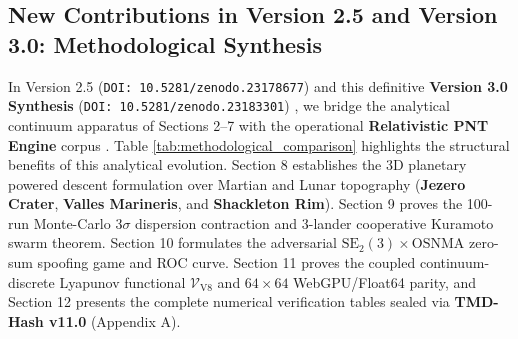 \documentclass[11pt,a4paper,reqno]{article}
\theoremstyle{definition}
\theoremstyle{remark}
\begin{document}
\subsection{New Contributions in Version 2.5 and Version 3.0: Methodological Synthesis}

In Version 2.5 (\texttt{DOI: 10.5281/zenodo.23178677}) \cite{ananda2026spde_v25} and this definitive \textbf{Version 3.0 Synthesis} (\texttt{DOI: 10.5281/zenodo.23183301}) \cite{ananda2026spde_v30}, we bridge the analytical continuum apparatus of Sections 2--7 with the operational \textbf{Relativistic PNT Engine} corpus \cite{ananda2026tmd_hash_v11, ananda2026modular_v75_synthesis, ananda2026automata_v70_monograph}. Table \ref{tab:methodological_comparison} highlights the structural benefits of this analytical evolution. Section 8 establishes the 3D planetary powered descent formulation over Martian and Lunar topography (\textbf{Jezero Crater}, \textbf{Valles Marineris}, and \textbf{Shackleton Rim}). Section 9 proves the 100-run Monte-Carlo $3\sigma$ dispersion contraction and 3-lander cooperative Kuramoto swarm theorem. Section 10 formulates the adversarial $\mathrm{SE}_2(3) \times \mathrm{OSNMA}$ zero-sum spoofing game and ROC curve. Section 11 proves the coupled continuum-discrete Lyapunov functional $\mathcal{V}_{\mathrm{V8}}$ and $64 \times 64$ WebGPU/Float64 parity, and Section 12 presents the complete numerical verification tables sealed via \textbf{TMD-Hash v11.0} (Appendix A).
\end{document}
